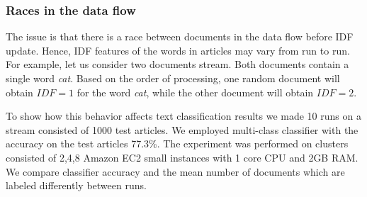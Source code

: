 \subsubsection{Races in the data flow}
The issue is that there is a race between documents in the data flow before IDF update. Hence, IDF features of the words in articles may vary from run to run. For example, let us consider two documents stream. Both documents contain a single word {\em cat}. Based on the order of processing, one random document will obtain $IDF=1$ for the word {\em cat}, while the other document will obtain $IDF=2$.

To show how this behavior affects text classification results we made 10 runs on a stream consisted of 1000 test articles. We employed multi-class classifier with the accuracy on the test articles 77.3\%. The experiment was performed on clusters consisted of 2,4,8 Amazon EC2 small instances with 1 core CPU and 2GB RAM. We compare classifier accuracy and the mean number of documents which are labeled differently between runs.




